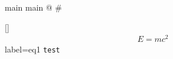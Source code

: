 \documentclass[10pt]{article}
\begin{document}
main main
@
#

\ref{}
\begin{align}
E = mc^{2}
\end{align}
label={eq1}
\lstinline[showlines]{test}
\begin{lstlisting}[print]
\end{lstlisting}
\end{document}
